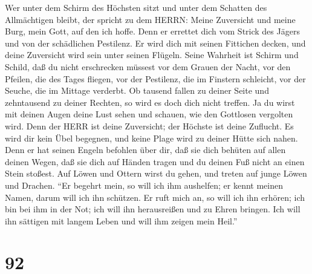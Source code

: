  Wer unter dem Schirm des Höchsten sitzt und unter dem
Schatten des Allmächtigen bleibt,  der spricht zu dem HERRN:
Meine Zuversicht und meine Burg, mein Gott, auf den ich hoffe.
 Denn er errettet dich vom Strick des Jägers und von der
schädlichen Pestilenz.  Er wird dich mit seinen Fittichen
decken, und deine Zuversicht wird sein unter seinen Flügeln. Seine
Wahrheit ist Schirm und Schild,  daß du nicht erschrecken
müssest vor dem Grauen der Nacht, vor den Pfeilen, die des Tages
fliegen,  vor der Pestilenz, die im Finstern schleicht, vor
der Seuche, die im Mittage verderbt.  Ob tausend fallen zu
deiner Seite und zehntausend zu deiner Rechten, so wird es doch dich
nicht treffen.  Ja du wirst mit deinen Augen deine Lust
sehen und schauen, wie den Gottlosen vergolten wird.  Denn
der HERR ist deine Zuversicht; der Höchste ist deine Zuflucht.
 Es wird dir kein Übel begegnen, und keine Plage wird zu
deiner Hütte sich nahen.  Denn er hat seinen Engeln
befohlen über dir, daß sie dich behüten auf allen deinen Wegen,
 daß sie dich auf Händen tragen und du deinen Fuß nicht an
einen Stein stoßest.  Auf Löwen und Ottern wirst du gehen,
und treten auf junge Löwen und Drachen.  ``Er begehrt mein,
so will ich ihm aushelfen; er kennt meinen Namen, darum will ich ihn
schützen.  Er ruft mich an, so will ich ihn erhören; ich
bin bei ihm in der Not; ich will ihn herausreißen und zu Ehren bringen.
 Ich will ihn sättigen mit langem Leben und will ihm zeigen
mein Heil.''

\hypertarget{section-91}{%
\section{92}\label{section-91}}

